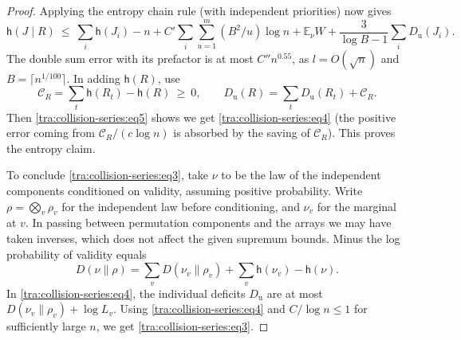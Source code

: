 \begin{proof}
Applying the entropy chain rule (with independent priorities) now gives
\[
\mathsf h(J\mid R)\ \le\ \sum_i\mathsf h(J_i)-n
  +C'\sum_i\sum_{u=1}^m (B^2/u)\log n
  +\mathbb E_\nu W
  +\frac{3}{\log B-1}\sum_i D_\mathrm{u}(J_i).
\]
The double sum error with its prefactor is at most \(C'' n^{0.55}\), as \(l=O(\sqrt n)\) and \(B=\lceil n^{1/100}\rceil\). In adding \(\mathsf h(R)\), use
\[
\mathcal C_R=\sum_t\mathsf h(R_t)-\mathsf h(R)\ \ge\ 0,\qquad
D_\mathrm{u}(R)=\sum_t D_\mathrm{u}(R_t)+\mathcal C_R.
\]
Then \eqref{tra:collision-series:eq5} shows we get \eqref{tra:collision-series:eq4} (the positive error coming from \(\mathcal C_R/(c\log n)\) is absorbed by the saving of \(\mathcal C_R\)). This proves the entropy claim.

To conclude \eqref{tra:collision-series:eq3}, take \(\nu\) to be the law of the independent components conditioned on validity, assuming positive probability. Write \(\rho=\bigotimes_v \rho_v\) for the independent law before conditioning, and \(\nu_v\) for the marginal at \(v\). In passing between permutation components and the arrays we may have taken inverses, which does not affect the given supremum bounds. Minus the log probability of validity equals
\[
D(\nu\|\rho)
 = \sum_v D(\nu_v\|\rho_v)+ \sum_v \mathsf h(\nu_v)-\mathsf h(\nu).
\]
In \eqref{tra:collision-series:eq4}, the individual deficits \(D_\mathrm{u}\) are at most \(D(\nu_v\|\rho_v)+\log L_v\). Using \eqref{tra:collision-series:eq4} and \(C/\log n\le 1\) for sufficiently large \(n\), we get \eqref{tra:collision-series:eq3}.
\end{proof}
